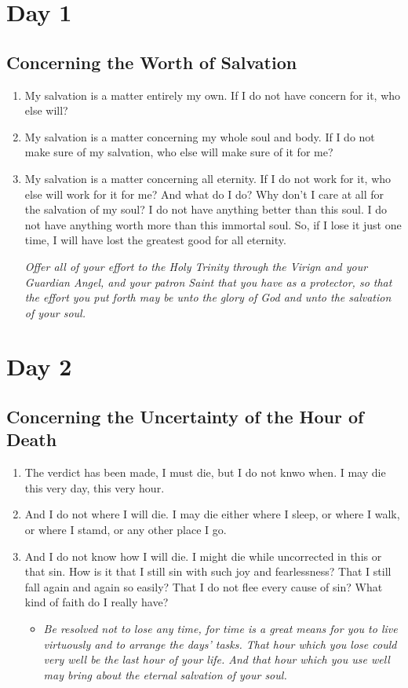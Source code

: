 \documentclass[11pt]{article}
\author{Ryan Harvey}
\date{\today}
\title{}
\begin{document}
\section{Day 1}
\label{sec:org4fd95d7}
\subsection{Concerning the Worth of Salvation}
\label{sec:org977c7fd}
\begin{enumerate}
\item My salvation is a matter entirely my own. If I do not have concern for it, who else will?
\item My salvation is a matter concerning my whole soul and body. If I do not make sure of my salvation, who else will make sure of it for me?
\item My salvation is a matter concerning all eternity. If I do not work for it, who else will work for it for me?
And what do I do? Why don't I care at all for the salvation of my soul? I do not have anything better than this soul. I do not have anything
worth more than this immortal soul. So, if I lose it just one time, I will have lost the greatest good for all eternity.

\emph{Offer all of your effort to the Holy Trinity through the Virign and your Guardian Angel, and your patron Saint that you have as a protector,
so that the effort you put forth may be unto the glory of God and unto the salvation of your soul.}
\end{enumerate}
\section{Day 2}
\label{sec:orgdce0e8f}
\subsection{Concerning the Uncertainty of the Hour of Death}
\label{sec:org946f3a3}
\begin{enumerate}
\item The verdict has been made, I must die, but I do not knwo when. I may die this very day, this very hour.
\item And I do not where I will die. I may die either where I sleep, or where I walk, or where I stamd, or any other place I go.
\item And I do not know how I will die. I might die while uncorrected in this or that sin. How is it that I still sin with such
joy and fearlessness? That I still fall again and again so easily? That I do not flee every cause of sin? What kind of faith do I really have?

\begin{itemize}
\item \emph{Be resolved not to lose any time, for time is a great means for you to live virtuously and to arrange the days' tasks. That hour which you
lose could very well be the last hour of your life. And that hour which you use well may bring about the eternal salvation of your soul.}
\end{itemize}
\end{enumerate}
\end{document}
